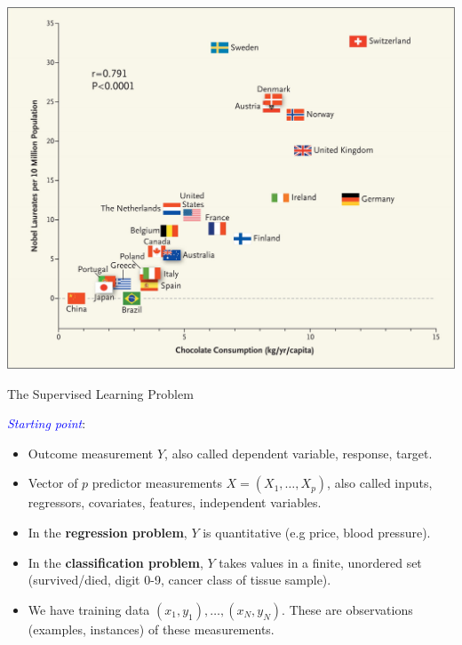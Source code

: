 \documentclass[ignorenonframetext,]{beamer}
\begin{document}
\begin{frame}

\includegraphics{chocolate.jpeg}

\end{frame}

\begin{frame}{The Supervised Learning Problem}

\textcolor{blue}{\emph{Starting point}}:

\begin{itemize}
\item
  Outcome measurement \(Y\), also called dependent variable, response,
  target.
\item
  Vector of \(p\) predictor measurements \(X=(X_1,\ldots,X_p)\), also
  called inputs, regressors, covariates, features, independent
  variables.
\item
  In the \textbf{regression problem}, \(Y\) is quantitative (e.g price,
  blood pressure).
\item
  In the \textbf{classification problem}, \(Y\) takes values in a
  finite, unordered set (survived/died, digit 0-9, cancer class of
  tissue sample).
\item
  We have training data \((x_1, y_1), \ldots , (x_N , y_N )\). These are
  observations (examples, instances) of these measurements.
\end{itemize}

\end{frame}
\end{document}
